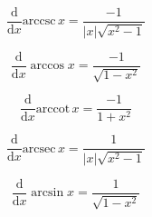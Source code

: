 






\[\begin{equation} \frac{\mathrm{d}}{\mathrm{d} x} \mathrm{arccsc}\, x = \frac{-1}{\left\lvert x \right\rvert \sqrt{x^2 - 1}} \end{equation}\]

\[\begin{equation} \frac{\mathrm{d}}{\mathrm{d} x} \arccos x = \frac{-1}{\sqrt{1-x^2}} \end{equation}\]

\[\begin{equation} \frac{\mathrm{d}}{\mathrm{d} x} \mathrm{arccot}\, x = \frac{-1}{1+x^2} \end{equation}\]

\[\begin{equation} \frac{\mathrm{d}}{\mathrm{d} x} \mathrm{arcsec}\, x = \frac{1}{\left\lvert x \right\rvert \sqrt{x^2 - 1}} \end{equation}\]

\[\begin{equation} \frac{\mathrm{d}}{\mathrm{d} x} \arcsin x = \frac{1}{\sqrt{1-x^2}} \end{equation}\]

